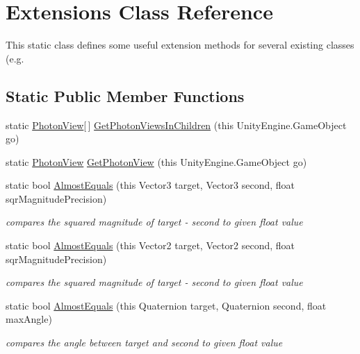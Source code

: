 \hypertarget{class_extensions}{}\section{Extensions Class Reference}
\label{class_extensions}


This static class defines some useful extension methods for several existing classes (e.\+g.  


\subsection*{Static Public Member Functions}
\begin{DoxyCompactItemize}
\item 
static \hyperlink{class_photon_view}{Photon\+View}\mbox{[}$\,$\mbox{]} \hyperlink{class_extensions_abd9afd41c4e0ce06bc3b49c04bed4523}{Get\+Photon\+Views\+In\+Children} (this Unity\+Engine.\+Game\+Object go)
\item 
static \hyperlink{class_photon_view}{Photon\+View} \hyperlink{class_extensions_a32cd3eb67b60887a800ecbc88ed7f121}{Get\+Photon\+View} (this Unity\+Engine.\+Game\+Object go)
\item 
static bool \hyperlink{class_extensions_a35fba37c30e813d78f40fbb4b88dca33}{Almost\+Equals} (this Vector3 target, Vector3 second, float sqr\+Magnitude\+Precision)
\begin{DoxyCompactList}\small\item\em compares the squared magnitude of target -\/ second to given float value\end{DoxyCompactList}\item 
static bool \hyperlink{class_extensions_a0d7e1279d0951869d76856a5ea84e7f3}{Almost\+Equals} (this Vector2 target, Vector2 second, float sqr\+Magnitude\+Precision)
\begin{DoxyCompactList}\small\item\em compares the squared magnitude of target -\/ second to given float value\end{DoxyCompactList}\item 
static bool \hyperlink{class_extensions_a7ce33f2b493f18ef1d30ffd06a249517}{Almost\+Equals} (this Quaternion target, Quaternion second, float max\+Angle)
\begin{DoxyCompactList}\small\item\em compares the angle between target and second to given float value\end{DoxyCompactList}\item 

\end{DoxyCompactItemize}
